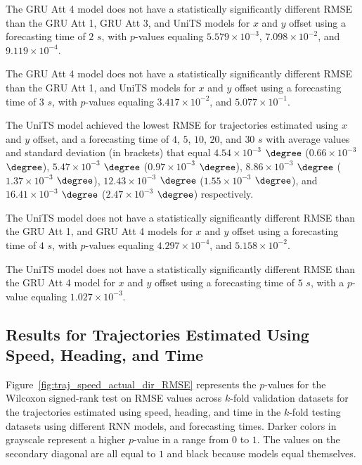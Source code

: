 The GRU Att 4 model does not have a statistically significantly different RMSE than the GRU Att 1, GRU Att 3, and UniTS models for $x$ and $y$ offset using a forecasting time of $2$ $s$, with $p$-values equaling $5.579 \times 10^{-3}$, $7.098 \times 10^{-2}$, and $9.119 \times 10^{-4}$.

The GRU Att 4 model does not have a statistically significantly different RMSE than the GRU Att 1, and UniTS models for $x$ and $y$ offset using a forecasting time of $3$ $s$, with $p$-values equaling $3.417 \times 10^{-2}$, and $5.077 \times 10^{-1}$.

The UniTS model achieved the lowest RMSE for trajectories estimated using $x$ and $y$ offset, and a forecasting time of $4$, $5$, $10$, $20$, and $30$ $s$ with average values and standard deviation (in brackets) that equal $4.54 \times 10^{-3}$ $\degree$ ($0.66 \times 10^{-3}$ $\degree$), $5.47 \times 10^{-3}$ $\degree$ ($0.97 \times 10^{-3}$ $\degree$), $8.86 \times 10^{-3}$ $\degree$ ($1.37 \times 10^{-3}$ $\degree$), $12.43 \times 10^{-3}$ $\degree$ ($1.55 \times 10^{-3}$ $\degree$), and $16.41 \times 10^{-3}$ $\degree$ ($2.47 \times 10^{-3}$ $\degree$) respectively.

The UniTS model does not have a statistically significantly different RMSE than the GRU Att 1, and GRU Att 4 models for $x$ and $y$ offset using a forecasting time of $4$ $s$, with $p$-values equaling $4.297 \times 10^{-4}$, and $5.158 \times 10^{-2}$.

The UniTS model does not have a statistically significantly different RMSE than the GRU Att 4 model for $x$ and $y$ offset using a forecasting time of $5$ $s$, with a $p$-value equaling $1.027 \times 10^{-3}$.

\subsection{Results for Trajectories Estimated Using Speed, Heading, and Time}

Figure~\ref{fig:traj_speed_actual_dir_RMSE} represents the $p$-values for the Wilcoxon signed-rank test on RMSE values across $k$-fold validation datasets for the trajectories estimated using speed, heading, and time in the $k$-fold testing datasets using different RNN models, and forecasting times. Darker colors in grayscale represent a higher $p$-value in a range from $0$ to $1$. The values on the secondary diagonal are all equal to $1$ and black because models equal themselves.

